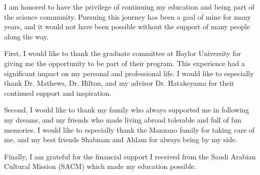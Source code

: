 
I am honored to have the privilege of continuing my education and being part of the science community. Pursuing this journey has been a goal of mine for many years, and it would not have been possible without the support of many people along the way.

First, I would like to thank the graduate committee at Baylor University for giving me the opportunity to be part of their program. This experience had a significant impact on my personal and professional life. I would like to especially thank Dr. Mathews, Dr. Hilton, and my advisor Dr. Hatakeyama for their continued support and inspiration.

Second, I would like to thank my family who always supported me in following my dreams, and my friends who made living abroad tolerable and full of fun memories. I would like to especially thank the Manzano family for taking care of me, and my best friends Shabnam and Ahlam for always being by my side.

Finally, I am grateful for the financial support I received from the Saudi Arabian Cultural Mission (SACM) which made my education possible.   

